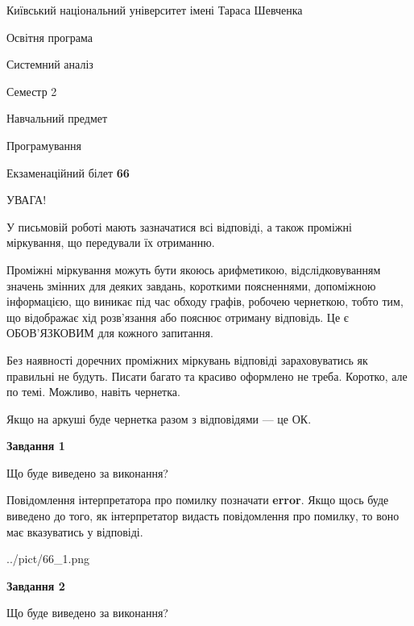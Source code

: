 \documentclass[12pt, ukrainian]{article}
\begin{document}
{{\begin {small}\par
{ \center  Київський національний університет імені Тараса Шевченка \par}
{\parbox {5 cm}{Освітня програма \hfill}{\parbox {7 cm}{Системний аналіз \hfill}}\parbox {6 cm}{\hfill Семестр 2}}\par
{\parbox {5 cm} {Навчальний предмет \hfill}\parbox {7 cm}{Програмування \hfill}\parbox {6cm}{\hfill}\par}\vspace{-7pt} \end{small}}{\center Екзаменаційний білет \No \textbf
{ 66 }\par}}
{
\begin {large}
УВАГА!

У письмовій роботі мають зазначатися всі відповіді, а також проміжні міркування, що передували їх отриманню.

Проміжні міркування можуть бути якоюсь арифметикою, відслідковуванням зна\-чень змінних для деяких завдань,
короткими поясненнями, допоміжною інформацією, що виникає під час обходу графів, робочею чернеткою,
тобто тим, що відображає хід розв’язання або пояснює отриману відповідь.
Це є ОБОВ’ЯЗКОВИМ для кожного запитання.

Без наявності доречних проміжних міркувань відповіді зараховуватись як правиль\-ні не будуть.
Писати багато та красиво оформлено не треба. Коротко, але по темі. Можли\-во, навіть чернетка.

Якщо на аркуші буде чернетка разом з відповідями --- це ОК.

\newpage

{\begin {center}\textbf{Завдання 1}\end {center}}\par
Що буде виведено за виконання?

Повідомлення інтерпретатора про помилку позначати \textbf{error}.
Якщо щось буде виведено до того, як інтерпретатор видасть повідомлення про помилку, 
то воно має вказуватись у відповіді. \par


\begin{center}
	{../pict/66_1.png}
\end{center}
\newpage

{\begin {center}\textbf{Завдання 2}\end {center}}\par
Що буде виведено за виконання?


\end{large}}
\end{document}
